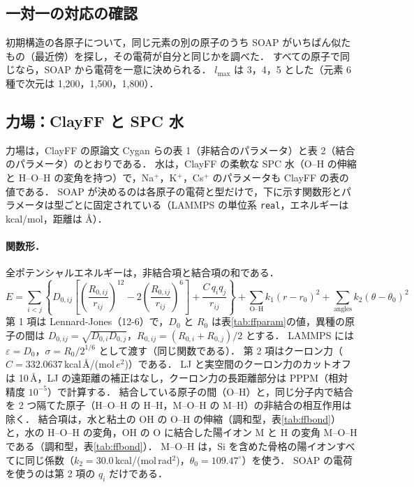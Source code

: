 \documentclass[a4paper,11pt]{article}
\begin{document}
\subsection{一対一の対応の確認}
初期構造の各原子について，同じ元素の別の原子のうち SOAP がいちばん似たもの（最近傍）を探し，その電荷が自分と同じかを調べた．
すべての原子で同じなら，SOAP から電荷を一意に決められる．
$l_{\max}$ は 3，4，5 とした（元素 6 種で次元は 1{,}200，1{,}500，1{,}800）．

\subsection{力場：ClayFF と SPC 水}
\label{sec:ff}
力場は，ClayFF の原論文 Cygan ら\cite{cygan2004}の表 1（非結合のパラメータ）と表 2（結合のパラメータ）のとおりである．
水は，ClayFF の柔軟な SPC 水（O--H の伸縮と H--O--H の変角を持つ）で，Na$^+$，K$^+$，Cs$^+$ のパラメータも ClayFF の表の値である．
SOAP が決めるのは各原子の電荷と型だけで，下に示す関数形とパラメータは型ごとに固定されている（LAMMPS の単位系 \texttt{real}，エネルギーは kcal/mol，距離は \AA）．

\paragraph{関数形．}
全ポテンシャルエネルギーは，非結合項と結合項の和である．
\begin{equation}
E = \sum_{i<j}\left\{ D_{0,ij}\left[\left(\frac{R_{0,ij}}{r_{ij}}\right)^{12}-2\left(\frac{R_{0,ij}}{r_{ij}}\right)^{6}\right] + \frac{C\,q_i q_j}{r_{ij}} \right\}
+ \sum_{\mathrm{O\text{--}H}} k_1 (r-r_0)^2 + \sum_{\mathrm{angles}} k_2(\theta-\theta_0)^2
\end{equation}
第 1 項は Lennard-Jones（12-6）で，$D_0$ と $R_0$ は表\ref{tab:ffparam}の値，異種の原子の間は $D_{0,ij}=\sqrt{D_{0,i}D_{0,j}}$，$R_{0,ij}=(R_{0,i}+R_{0,j})/2$ とする．
LAMMPS には $\varepsilon = D_0$，$\sigma = R_0/2^{1/6}$ として渡す（同じ関数である）．
第 2 項はクーロン力（$C = 332.0637$\,kcal\,\AA/(mol\,$e^2$)）である．
LJ と実空間のクーロン力のカットオフは 10\,\AA，LJ の遠距離の補正はなし，クーロン力の長距離部分は PPPM（相対精度 $10^{-5}$）で計算する．
結合している原子の間（O--H）と，同じ分子内で結合を 2 つ隔てた原子（H--O--H の H--H，M--O--H の M--H）の非結合の相互作用は除く．
結合項は，水と粘土の OH の O--H の伸縮（調和型，表\ref{tab:ffbond}）と，水の H--O--H の変角，OH の O に結合した陽イオン M と H の変角 M--O--H である（調和型，表\ref{tab:ffbond}）．
M--O--H は，Si を含めた骨格の陽イオンすべてに同じ係数（$k_2=30.0$\,kcal/(mol\,rad$^2$)，$\theta_0=109.47^\circ$）を使う．
SOAP の電荷を使うのは第 2 項の $q_i$ だけである．
\end{document}
